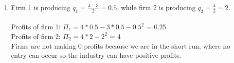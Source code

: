 \documentclass{article}
\newenvironment{solution}{\color{red}}{\color{black}}
\begin{document}
\begin{solution}
\begin{enumerate}
\item Firm 1 is producing $q_1 = \frac{4-3}{2}= 0.5$, while firm 2 is producing $q_2 = \frac{4}{2} = 2$.\\ \\
Profits of firm 1: $\Pi_1 = 4*0.5 - 3*0.5 -0.5^2$ = 0.25 \\
Profits of firm 2: $\Pi_2 = 4*2  -2^2$ = 4 \\

Firms are not making 0 profits because we are in the short run, where no entry can occur so the industry can have positive profits.
\end{enumerate}

\end{solution}
\end{document}
